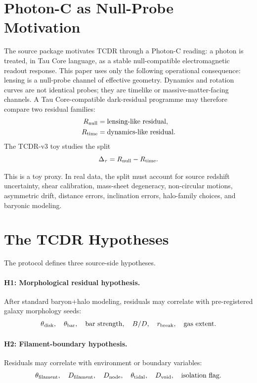 \documentclass[11pt]{article}
\begin{document}
\section{Photon-C as Null-Probe Motivation}

The source package motivates TCDR through a Photon-C reading: a photon is
treated, in Tau Core language, as a stable null-compatible electromagnetic
readout response.  This paper uses only the following operational consequence:
lensing is a null-probe channel of effective geometry.  Dynamics and rotation
curves are not identical probes; they are timelike or massive-matter-facing
channels.  A Tau Core-compatible dark-residual programme may therefore compare
two residual families:
\begin{align}
  R_{\rm null} &= \text{lensing-like residual},\\
  R_{\rm time} &= \text{dynamics-like residual}.
\end{align}
The TCDR-v3 toy studies the split
\begin{equation}
  \Delta_{\tau}=R_{\rm null}-R_{\rm time}.
\end{equation}

This is a toy proxy.  In real data, the split must account for source redshift
uncertainty, shear calibration, mass-sheet degeneracy, non-circular motions,
asymmetric drift, distance errors, inclination errors, halo-family choices,
and baryonic modeling.

\section{The TCDR Hypotheses}

The protocol defines three source-side hypotheses.

\paragraph{H1: Morphological residual hypothesis.}
After standard baryon+halo modeling, residuals may correlate with
pre-registered galaxy morphology seeds:
\[
  \theta_{\rm disk},\quad
  \theta_{\rm bar},\quad
  \text{bar strength},\quad
  B/D,\quad
  r_{\rm break},\quad
  \text{gas extent}.
\]

\paragraph{H2: Filament-boundary hypothesis.}
Residuals may correlate with environment or boundary variables:
\[
  \theta_{\rm filament},\quad
  D_{\rm filament},\quad
  D_{\rm node},\quad
  \theta_{\rm tidal},\quad
  D_{\rm void},\quad
  \text{isolation flag}.
\]
\end{document}
